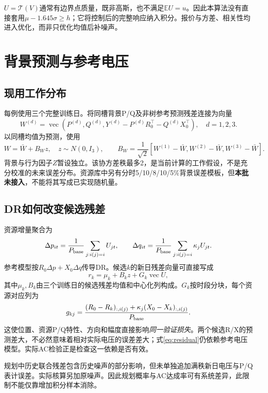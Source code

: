 \documentclass[UTF8,a4paper,11pt]{ctexart}
\newcommand{\E}{\mathbb E}\newcommand{\Prb}{\mathbb P}\newcommand{\R}{\mathbb R}
\newcommand{\Tcal}{\mathcal T}\newcommand{\ind}{\mathbf 1}
\begin{document}
$U=\Tcal(V)$通常有边界点质量，既非高斯，也不满足$\E U=u$。因此本算法没有直接套用$\mu-1.645\sigma\geq h$；它将控制后的完整响应纳入积分。报价与方差、相关性均进入优化，而非只优化均值后补噪声。

\section{背景预测与参考电压}
\subsection{现用工作分布}
每例使用三个完整训练日。将同槽背景P/Q及非树参考预测残差连接为向量
\begin{equation}
 W^{(d)}=\operatorname{vec}\left(P^{(d)},Q^{(d)},
 Y^{(d)}-P^{(d)}R_0^\top-Q^{(d)}X_0^\top\right),\quad d=1,2,3.
\end{equation}
以同槽均值为预测，使用
\begin{equation}
 W=\bar W+B_Wz,\quad z\sim N(0,I_3),\qquad
 B_W=\frac1{\sqrt2}[W^{(1)}-\bar W,W^{(2)}-\bar W,W^{(3)}-\bar W].
\end{equation}
背景与行为因子$Z$暂设独立。该协方差秩最多2，是当前计算的工作假设，不是充分校准的未来误差分布。资源库中另有分时5/10/8/10/5\%背景误差模板，但\textbf{本批未接入}，不能将其写成已实现随机量。

\subsection{DR如何改变候选残差}
资源增量聚合为
\begin{equation}
 \Delta p_{it}=\frac1{P_{\rm base}}\sum_{j:i(j)=i}U_{jt},\qquad
 \Delta q_{it}=\frac1{P_{\rm base}}\sum_{j:i(j)=i}\kappa_jU_{jt}.
\end{equation}
参考模型按$R_0\Delta p+X_0\Delta q$传导DR。候选$k$的新日残差向量可直接写成
\begin{equation}
 r_k=\mu_k+B_kz+G_k\operatorname{vec}U,\label{eq:residual}
\end{equation}
其中$\mu_k,B_k$由三个训练日的候选残差均值和中心化列构成。$G_k$按时段分块，每个资源对应列为
\begin{equation}
 g_{kj}=\frac{(R_0-R_k)_{:,i(j)}+\kappa_j(X_0-X_k)_{:,i(j)}}{P_{\rm base}}.
\end{equation}
这使位置、资源P/Q特性、方向和幅度直接影响\emph{同一验证损失}。两个候选R/X的预测差大，不必然意味着相对实际电压的误差差大；式\eqref{eq:residual}仍依赖参考电压模型。实际AC检验正是检查这一依赖是否有效。

规划中历史联合残差包含历史噪声的部分影响，但未单独追加满秩新日电压与P/Q表计误差。实际核算另加原噪声。因此规划概率与AC达成率可有系统差异，此限制不能仅靠增加积分样本消除。
\end{document}

